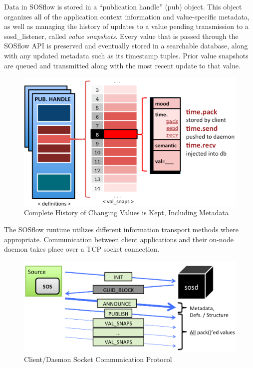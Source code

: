 
Data in SOSflow is stored in a ``publication handle'' (pub) object.
%
This object organizes all of the application context information and
value-specific metadata, as well as managing the history of updates to
a value pending transmission to a sosd\_listener, called
\textit{value snapshots}.
%
Every value that is passed through the SOSflow API is preserved and
eventually stored in a searchable database, along with any updated
metadata such as its timestamp tuples.
%
%
Prior value snapshots are queued and transmitted along
with the most recent update to that value.
\begin{figure}[h]
\centering
\includegraphics[width=\columnwidth]{images/val_snaps.png}
\caption{Complete History of Changing Values is Kept, Including Metadata}
\label{fig_val_snaps}
\end{figure}
%
\par
%
The SOSflow runtime utilizes different information transport methods
where appropriate.
%
Communication between client applications and their on-node daemon
takes place over a TCP socket connection.
%
\begin{figure}[h]
\centering
\includegraphics[width=\columnwidth]{images/sosd_protocol.png}
\caption{Client/Daemon Socket Communication Protocol}
\label{fig_sosd_protocol}
\end{figure}
